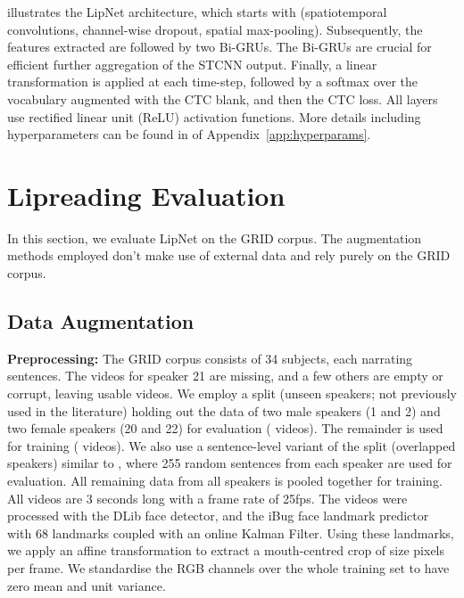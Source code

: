 \documentclass{article}
\newcommand{\minisec}[1]{\textbf{#1:}}
\begin{document}
 illustrates the LipNet architecture, which starts with (spatiotemporal convolutions, channel-wise dropout, spatial max-pooling).
Subsequently, the features extracted are followed by two Bi-GRUs. The Bi-GRUs are crucial for efficient further aggregation of the STCNN output.
Finally, a linear transformation is applied at each time-step, followed by a softmax over the vocabulary augmented with the CTC blank, and then the CTC loss. All layers use rectified linear unit (ReLU) activation functions. More details including hyperparameters can be found in  of Appendix~\ref{app:hyperparams}.
 

 
\newcommand\speakerindep{Unseen Speakers }
\newcommand\speakerdep{Overlapped Speakers }

\section{Lipreading Evaluation}

In this section, we evaluate LipNet on the GRID corpus. The augmentation methods employed don't make use of external data and rely purely on the GRID corpus.

\subsection{Data Augmentation}


\minisec{Preprocessing} The GRID corpus consists of 34 subjects, each narrating  sentences. The videos for speaker 21 are missing, and a few others are empty or corrupt, leaving  usable videos.
We employ a split (unseen speakers; not previously used in the literature) holding out the data of two male speakers (1 and 2) and two female speakers (20 and 22) for evaluation ( videos). The remainder is used for training ( videos).
We also use a sentence-level variant of the split (overlapped speakers) similar to \cite{wand2016lipreading}, where 255 random sentences from each speaker are used for evaluation. All remaining data from all speakers is pooled together for training.
All videos are 3 seconds long with a frame rate of 25fps. The videos were processed with the DLib face detector, and the iBug face landmark predictor~\citep{sagonas2013300} with 68 landmarks coupled with an online Kalman Filter. Using these landmarks, we apply an affine transformation to extract a mouth-centred crop of size  pixels per frame. We standardise the RGB channels over the whole training set to have zero mean and unit variance.
\end{document}

